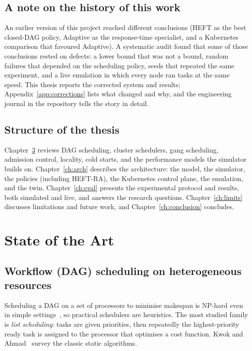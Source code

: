 \documentclass[12pt,a4paper]{report}
\begin{document}
\section{A note on the history of this work}

An earlier version of this project reached different conclusions (HEFT as
the best closed-DAG policy, Adaptive as the response-time specialist, and
a Kubernetes comparison that favoured Adaptive). A systematic audit found
that some of those conclusions rested on defects: a lower bound that was
not a bound, random failures that depended on the scheduling policy,
seeds that repeated the same experiment, and a live emulation in which
every node ran tasks at the same speed. This thesis reports the corrected
system and results; Appendix~\ref{app:corrections} lists what changed and
why, and the engineering journal in the repository tells the story in
detail.

\section{Structure of the thesis}

Chapter~\ref{ch:sota} reviews DAG scheduling, cluster schedulers,
gang scheduling, admission control, locality, cold starts, and the
performance models the simulator builds on. Chapter~\ref{ch:arch}
describes the architecture: the model, the simulator, the policies
(including HEFT-RA), the Kubernetes control plane, the emulation, and the
twin. Chapter~\ref{ch:eval} presents the experimental protocol and
results, both simulated and live, and answers the research questions.
Chapter~\ref{ch:limits} discusses limitations and future work, and
Chapter~\ref{ch:conclusion} concludes.

\chapter{State of the Art}
\label{ch:sota}

\section{Workflow (DAG) scheduling on heterogeneous resources}

Scheduling a DAG on a set of processors to minimise makespan is
NP-hard even in simple settings~\cite{ullman1975np}, so practical
schedulers are heuristics. The most studied family is \emph{list
scheduling}: tasks are given priorities, then repeatedly the
highest-priority ready task is assigned to the processor that optimises a
cost function. Kwok and Ahmad~\cite{kwok1999static} survey the classic
static algorithms.
\end{document}
